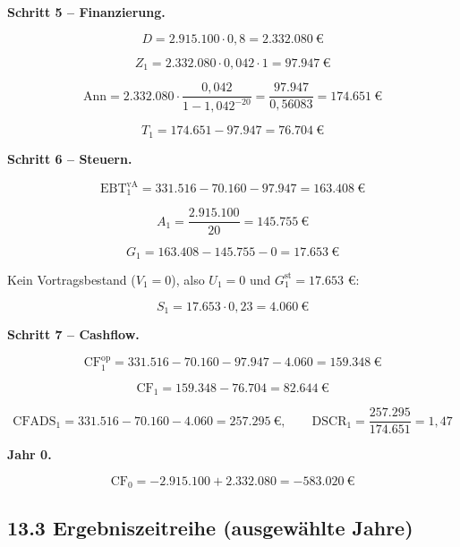 \documentclass[
  a4paper,
  10pt]{article}
\begin{document}
\textbf{Schritt 5 -- Finanzierung.}

\[ D = 2.915.100 \cdot 0{,}8 = 2.332.080\ \text{€} \]

\[ Z_1 = 2.332.080 \cdot 0{,}042 \cdot 1 = 97.947\ \text{€} \]

\[ \mathrm{Ann} = 2.332.080 \cdot \frac{0{,}042}{1 - 1{,}042^{-20}} = \frac{97.947}{0{,}56083} = 174.651\ \text{€} \]

\[ T_1 = 174.651 - 97.947 = 76.704\ \text{€} \]

\textbf{Schritt 6 -- Steuern.}

\[ \mathrm{EBT}^{\mathrm{vA}}_1 = 331.516 - 70.160 - 97.947 = 163.408\ \text{€} \]

\[ A_1 = \frac{2.915.100}{20} = 145.755\ \text{€} \]

\[ G_1 = 163.408 - 145.755 - 0 = 17.653\ \text{€} \]

Kein Vortragsbestand (\(V_1 = 0\)), also \(U_1 = 0\) und
\(G^{\mathrm{st}}_1 = 17.653\) €:

\[ S_1 = 17.653 \cdot 0{,}23 = 4.060\ \text{€} \]

\textbf{Schritt 7 -- Cashflow.}

\[ \mathrm{CF}^{\mathrm{op}}_1 = 331.516 - 70.160 - 97.947 - 4.060 = 159.348\ \text{€} \]

\[ \mathrm{CF}_1 = 159.348 - 76.704 = 82.644\ \text{€} \]

\[ \mathrm{CFADS}_1 = 331.516 - 70.160 - 4.060 = 257.295\ \text{€}, \qquad \mathrm{DSCR}_1 = \frac{257.295}{174.651} = 1{,}47 \]

\textbf{Jahr 0.}

\[ \mathrm{CF}_0 = -2.915.100 + 2.332.080 = -583.020\ \text{€} \]

\hypertarget{ergebniszeitreihe-ausgewuxe4hlte-jahre}{%
\subsection{13.3 Ergebniszeitreihe (ausgewählte
Jahre)}\label{ergebniszeitreihe-ausgewuxe4hlte-jahre}}
\end{document}
